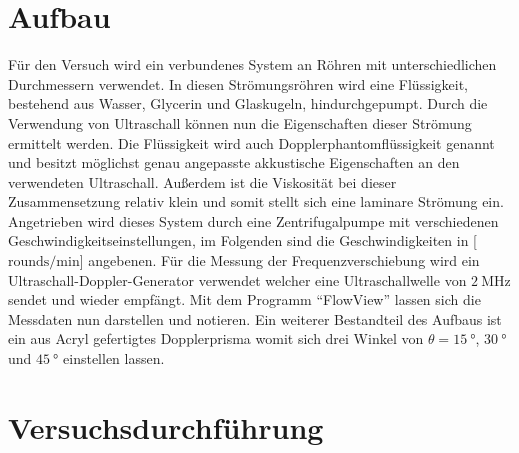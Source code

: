 \section{Aufbau}

Für den Versuch wird ein verbundenes System an Röhren mit unterschiedlichen Durchmessern verwendet. In diesen Strömungsröhren wird eine Flüssigkeit, bestehend aus Wasser, Glycerin und Glaskugeln, hindurchgepumpt. Durch die Verwendung von Ultraschall
können nun die Eigenschaften dieser Strömung ermittelt werden.
Die Flüssigkeit wird auch Dopplerphantomflüssigkeit genannt und besitzt möglichst genau angepasste akkustische Eigenschaften an den verwendeten Ultraschall. Außerdem ist die Viskosität bei dieser Zusammensetzung relativ klein und somit
stellt sich eine laminare Strömung ein. 
Angetrieben wird dieses System durch eine Zentrifugalpumpe mit verschiedenen Geschwindigkeitseinstellungen, im Folgenden sind die Geschwindigkeiten in [$\si{{\text{rounds}}\per\minute}$] angebenen.
Für die Messung der Frequenzverschiebung wird ein Ultraschall-Doppler-Generator verwendet welcher eine Ultraschallwelle von $\SI{2}{\mega\hertz}$ sendet und wieder empfängt. 
Mit dem Programm \enquote{FlowView} lassen sich die Messdaten nun darstellen und notieren.
Ein weiterer Bestandteil des Aufbaus ist ein aus Acryl gefertigtes Dopplerprisma womit sich drei Winkel von $\theta = \SI{15}{\degree}$, $\SI{30}{\degree}$ und $\SI{45}{\degree} $ einstellen lassen. 

\section{Versuchsdurchführung}

